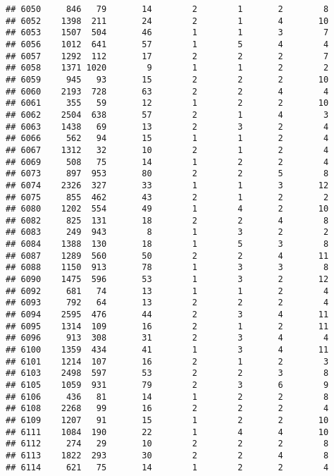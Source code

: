 \documentclass[]{article}
\begin{document}
\begin{verbatim}
## 6050     846   79       14        2        1       2        8
## 6052    1398  211       24        2        1       4       10
## 6053    1507  504       46        1        1       3        7
## 6056    1012  641       57        1        5       4        4
## 6057    1292  112       17        2        2       2        7
## 6058    1371 1020        9        1        1       2        2
## 6059     945   93       15        2        2       2       10
## 6060    2193  728       63        2        2       4        4
## 6061     355   59       12        1        2       2       10
## 6062    2504  638       57        2        1       4        3
## 6063    1438   69       13        2        3       2        4
## 6066     562   94       15        1        1       2        4
## 6067    1312   32       10        2        1       2        4
## 6069     508   75       14        1        2       2        4
## 6073     897  953       80        2        2       5        8
## 6074    2326  327       33        1        1       3       12
## 6075     855  462       43        2        1       2        2
## 6080    1202  554       49        1        4       2       10
## 6082     825  131       18        2        2       4        8
## 6083     249  943        8        1        3       2        2
## 6084    1388  130       18        1        5       3        8
## 6087    1289  560       50        2        2       4       11
## 6088    1150  913       78        1        3       3        8
## 6090    1475  596       53        1        3       2       12
## 6092     681   74       13        1        1       2        4
## 6093     792   64       13        2        2       2        4
## 6094    2595  476       44        2        3       4       11
## 6095    1314  109       16        2        1       2       11
## 6096     913  308       31        2        3       4        4
## 6100    1359  434       41        1        3       4       11
## 6101    1214  107       16        2        1       2        3
## 6103    2498  597       53        2        2       3        8
## 6105    1059  931       79        2        3       6        9
## 6106     436   81       14        1        2       2        8
## 6108    2268   99       16        2        2       2        4
## 6109    1207   91       15        1        2       2       10
## 6111    1084  190       22        1        4       4       10
## 6112     274   29       10        2        2       2        8
## 6113    1822  293       30        2        2       4        8
## 6114     621   75       14        1        2       2        4

\end{verbatim}
\end{document}
